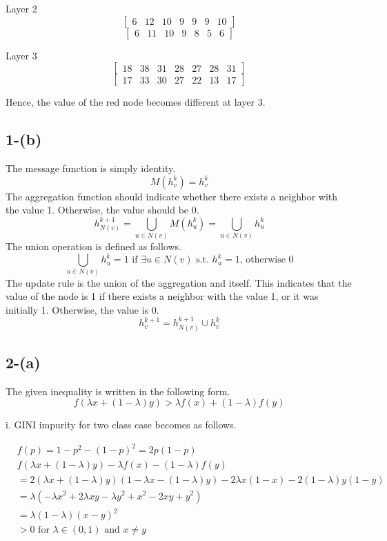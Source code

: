 \documentclass{article}
\begin{document}
Layer 2
\[
\begin{bmatrix}
6 & 12 & 10 & 9 & 9 & 9 & 10
\end{bmatrix}
\]
\[
\begin{bmatrix}
6 & 11 & 10 & 9 & 8 & 5 & 6
\end{bmatrix}
\]

Layer 3
\[
\begin{bmatrix}
18 & 38 & 31 & 28 & 27 & 28 & 31
\end{bmatrix}
\]
\[
\begin{bmatrix}
17 & 33 & 30 & 27 & 22 & 13 & 17
\end{bmatrix}
\]


Hence, the value of the red node becomes different at layer 3. \\



\subsection*{1-(b)}
The message function is simply identity.
\[
    M(h^k_v) = h^k_v    
\]
The aggregation function should indicate whether there exists a neighbor with the value 1.
Otherwise, the value should be 0.\\
\[
    h^{k+1}_{N(v)} = \bigcup_{u \in N(v)} M(h^k_u) = \bigcup_{u \in N(v)} h^k_u
\]
The union operation is defined as follows.
\[
    \bigcup_{u \in N(v)} h^k_u = 1 \text{ if } \exists u \in N(v) \text{ s.t. } h^k_u = 1 \text{, otherwise } 0
\]
The update rule is the union of the aggregation and itself. This indicates that the value of the node
is 1 if there exists a neighbor with the value 1, or it was initially 1. Otherwise, the value is 0.\\
\[
    h^{k+1}_v = h^{k+1}_{N(v)} \cup h^k_v
\]


\subsection*{2-(a)}

The given inequality is written in the following form.
\[
    f(\lambda x + (1-\lambda)y) > \lambda f(x) + (1-\lambda)f(y)
\]


i. GINI impurity for two class case becomes as follows.

\begin{align*}
    & f(p) = 1 - p^2 - (1-p)^2 = 2p(1-p) \\
    & f(\lambda x + (1-\lambda)y) - \lambda f(x) - (1-\lambda)f(y) \\
    &= 2(\lambda x + (1-\lambda) y) (1-\lambda x - (1-\lambda)y) - 2\lambda x (1 - x) - 2(1-\lambda)y(1 - y) \\
    &= \lambda (-\lambda x^2 + 2 \lambda x y - \lambda y^2 + x^2 - 2 x y + y^2) \\
    &= \lambda (1 - \lambda) (x - y)^2 \\
    &> 0 \text{ for } \lambda \in (0, 1) \text{ and } x \neq y
\end{align*}
\end{document}
